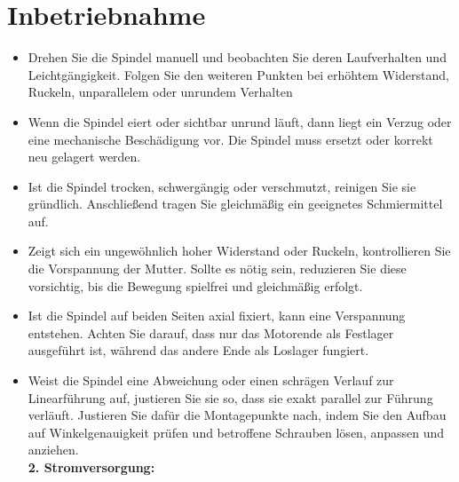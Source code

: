 \documentclass[a4paper,12pt]{report}
\begin{document}
	\section{Inbetriebnahme}
	\begin{itemize}[leftmargin=1.5em]
		Die Inbetriebnahme des Demonstrators erfolgt in mehreren definierten Schritten, um einen sicheren und zuverlässigen Betrieb zu gewährleisten. Besonders wichtig ist dabei die korrekte Spindelspannung, die Stromversorgung sowie die saubere Initialisierung der Steuerung. \\[0,75cm]
		
		\textbf{1. Spindel prüfen:}
		
		\item Drehen Sie die Spindel manuell und beobachten Sie deren Laufverhalten und Leichtgängigkeit. Folgen Sie den weiteren Punkten bei erhöhtem Widerstand, Ruckeln, unparallelem oder unrundem Verhalten 
		
		\item Wenn die Spindel eiert oder sichtbar unrund läuft, dann liegt ein Verzug oder eine mechanische Beschädigung vor. Die Spindel muss ersetzt oder korrekt neu gelagert werden.
		
		\item Ist die Spindel trocken, schwergängig oder verschmutzt, reinigen Sie sie gründlich. Anschließend tragen Sie gleichmäßig ein geeignetes Schmiermittel auf. 
		
		\item Zeigt sich ein ungewöhnlich hoher Widerstand oder Ruckeln, kontrollieren Sie die Vorspannung der Mutter. Sollte es nötig sein, reduzieren Sie diese vorsichtig, bis die Bewegung spielfrei und gleichmäßig erfolgt. 
		
		\item Ist die Spindel auf beiden Seiten axial fixiert, kann eine Verspannung entstehen. Achten Sie darauf, dass nur das Motorende als Festlager ausgeführt ist, während das andere Ende als Loslager fungiert.
		
		\item Weist die Spindel eine Abweichung oder einen schrägen Verlauf zur Linearführung auf, justieren Sie sie so, dass sie exakt parallel zur Führung verläuft. Justieren Sie dafür die Montagepunkte nach, indem Sie den Aufbau auf Winkelgenauigkeit prüfen und betroffene Schrauben lösen, anpassen und anziehen.\\
		
		
		\textbf{2. Stromversorgung:}
		

\end{itemize}
\end{document}
